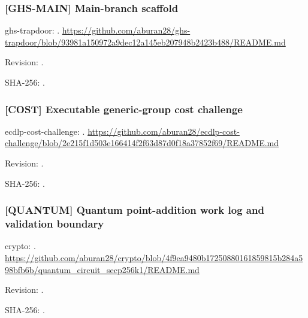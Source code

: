 \par\noindent\begin{minipage}{\linewidth}\small
\subsubsection*{[GHS-MAIN] Main-branch scaffold}\label{art:GHS-MAIN}
ghs-trapdoor: .
\url{https://github.com/aburan28/ghs-trapdoor/blob/93981a150972a9dec12a145eb207948b2423b488/README.md}
\par Revision: .
\par SHA-256: .
\end{minipage}\par\medskip

\par\noindent\begin{minipage}{\linewidth}\small
\subsubsection*{[COST] Executable generic-group cost challenge}\label{art:COST}
ecdlp-cost-challenge: .
\url{https://github.com/aburan28/ecdlp-cost-challenge/blob/2e215f1d503e166414f2f63d87d0f18a37852f69/README.md}
\par Revision: .
\par SHA-256: .
\end{minipage}\par\medskip

\par\noindent\begin{minipage}{\linewidth}\small
\subsubsection*{[QUANTUM] Quantum point-addition work log and validation boundary}\label{art:QUANTUM}
crypto: .
\url{https://github.com/aburan28/crypto/blob/4f9ea9480b17250880161859815b284a598bfb6b/quantum_circuit_secp256k1/README.md}
\par Revision: .
\par SHA-256: .
\end{minipage}\par\medskip

